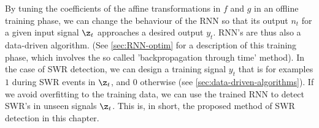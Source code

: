 
By tuning the coefficients of the affine transformations in $f$ and $g$ in an offline training phase, we can change the behaviour of the RNN so that its output $n_t$ for a given input signal $\z_t$ approaches a desired output $y_t$. RNN's are thus also a data-driven algorithm. (See \cref{sec:RNN-optim} for a description of this training phase, which involves the so called 'backpropagation through time' method). In the case of SWR detection, we can design a training signal $y_t$ that is for examples $1$ during SWR events in $\z_t$, and $0$ otherwise (see \cref{sec:data-driven-algorithms}). If we avoid overfitting to the training data, we can use the trained RNN to detect SWR's in unseen signals $\z_t$. This is, in short, the proposed method of SWR detection in this chapter.
